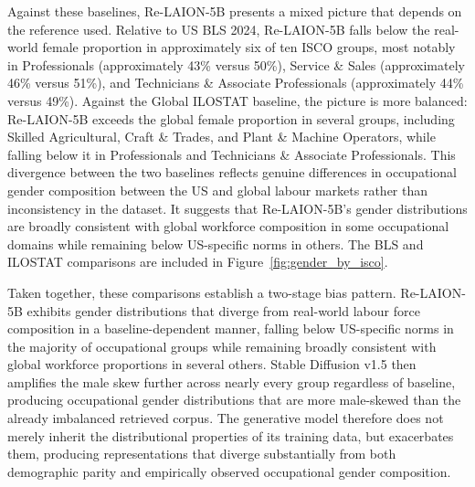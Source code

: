 Against these baselines, Re-LAION-5B presents a mixed picture that depends on the reference used. Relative to US BLS 2024, Re-LAION-5B falls below the real-world female proportion in approximately six of ten ISCO groups, most notably in Professionals (approximately 43\% versus 50\%), Service \& Sales (approximately 46\% versus 51\%), and Technicians \& Associate Professionals (approximately 44\% versus 49\%). Against the Global ILOSTAT baseline, the picture is more balanced: Re-LAION-5B exceeds the global female proportion in several groups, including Skilled Agricultural, Craft \& Trades, and Plant \& Machine Operators, while falling below it in Professionals and Technicians \& Associate Professionals. This divergence between the two baselines reflects genuine differences in occupational gender composition between the US and global labour markets rather than inconsistency in the dataset. It suggests that Re-LAION-5B's gender distributions are broadly consistent with global workforce composition in some occupational domains while remaining below US-specific norms in others. The BLS and ILOSTAT comparisons are included in Figure~\ref{fig:gender_by_isco}.

Taken together, these comparisons establish a two-stage bias pattern. Re-LAION-5B exhibits gender distributions that diverge from real-world labour force composition in a baseline-dependent manner, falling below US-specific norms in the majority of occupational groups while remaining broadly consistent with global workforce proportions in several others. Stable Diffusion v1.5 then amplifies the male skew further across nearly every group regardless of baseline, producing occupational gender distributions that are more male-skewed than the already imbalanced retrieved corpus. The generative model therefore does not merely inherit the distributional properties of its training data, but exacerbates them, producing representations that diverge substantially from both demographic parity and empirically observed occupational gender composition.

